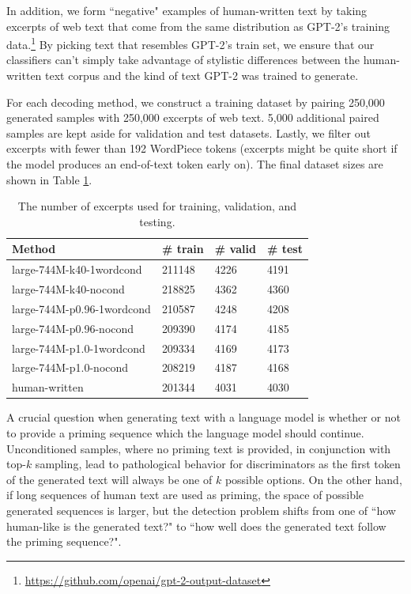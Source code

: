 In addition, we form ``negative" examples of human-written text by taking excerpts of web text that come from the same distribution as GPT-2's training data.\footnote{\url{https://github.com/openai/gpt-2-output-dataset}}
By picking text that resembles GPT-2's train set, we ensure that our classifiers can't simply take advantage of stylistic differences between the human-written text corpus and the kind of text GPT-2 was trained to generate.

For each decoding method, we construct a training dataset by pairing 250,000 generated samples with 250,000 excerpts of web text.
5,000 additional paired samples are kept aside for validation and test datasets.
Lastly, we filter out excerpts with fewer than 192 WordPiece tokens \citep{wu2016google} (excerpts might be quite short if the model produces an end-of-text token early on).
The final dataset sizes are shown in Table \ref{tab:dataset_sizes}.

\begin{table}[t]
    \small
    \centering
    \begin{tabular}{l|l|l|l}
    \hline
    \textbf{Method} & \textbf{\# train} & \textbf{\# valid} & \textbf{\# test} \\ \hline \hline
    large-744M-k40-1wordcond & 211148 & 4226 & 4191 \\
    large-744M-k40-nocond & 218825 & 4362 & 4360 \\
    large-744M-p0.96-1wordcond & 210587 & 4248 & 4208 \\ 
    large-744M-p0.96-nocond & 209390 & 4174 & 4185 \\ 
    large-744M-p1.0-1wordcond & 209334 & 4169 & 4173 \\ 
    large-744M-p1.0-nocond & 208219 & 4187 & 4168 \\ \Xhline{\arrayrulewidth}
    human-written & 201344 & 4031 & 4030 \\ \hline
    \end{tabular}
    \caption{The number of excerpts used for training, validation, and testing.}
    \label{tab:dataset_sizes}
\end{table}

A crucial question when generating text with a language model is whether or not to provide a priming sequence which the language model should continue.
Unconditioned samples, where no priming text is provided, in conjunction with top-$k$ sampling, lead to pathological behavior for discriminators as the first token of the generated text will always be one of $k$ possible options.
On the other hand, if long sequences of human text are used as priming, the space of possible generated sequences is larger, but the detection problem shifts from one of ``how human-like is the generated text?" to ``how well does the generated text follow the priming sequence?".

